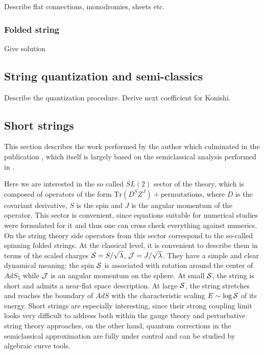 Describe flat connections, monodromies, sheets etc.

\subsubsection{Folded string}

Give solution

\subsection{String quantization and semi-classics}

Describe the quantization procedure. Derive next coefficient for Konishi.

\subsection{Short strings}


This section describes the work performed by the author which culminated in the publication \cite{Gromov:2011bz}, which itself is largely based on the semiclassical analysis performed in \cite{Gromov:2011de}. 

Here we are interested in the so called $SL(2)$ sector of the theory, which is composed of operators of the form $\mathrm{Tr}( D^S Z^J ) + \mathrm{permutations}$, where $D$ is the covariant derivative, $S$ is the spin and $J$ is the angular momentum of the operator. This sector is convenient, since equations suitable for numerical studies were formulated for it and thus one can cross check everything against numerics. On the string theory side operators from this sector correspond to the so-called spinning folded strings. At the classical level, it is convenient to describe them in terms of the scaled charges $\mathcal S = S/\sqrt\lambda$, $\mathcal J = J/\sqrt\lambda$. They have a simple and clear dynamical meaning: the spin $\mathcal S$ is associated with rotation around the center of  $AdS_{5}$ while $\mathcal J$ is an angular momentum on the sphere. At small $\mathcal S$, the string is short and admits a near-flat space description. At large $\mathcal S$, the string stretches and reaches the boundary of $AdS$ with the characteristic scaling $E \sim \log \mathcal S$ of its energy. Short strings are especially interesting, since their strong coupling limit looks very difficult to address both within the gauge theory and perturbative string theory approaches, on the other hand, quantum corrections in the semiclassical approximation are fully under control and can be studied by algebraic curve tools.

